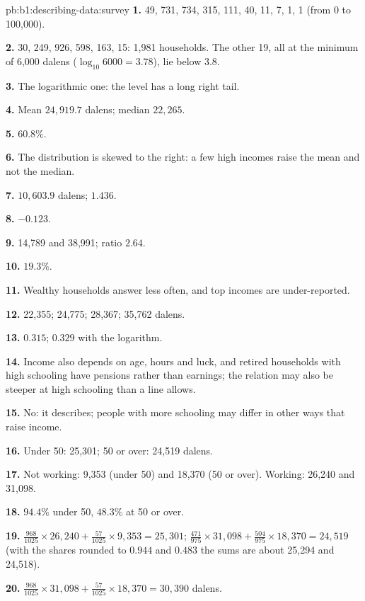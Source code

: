 \begin{solution}{pb:b1:describing-data:survey}
\textbf{1.} 49, 731, 734, 315, 111, 40, 11, 7, 1, 1 (from 0 to 100,000).

\textbf{2.} 30, 249, 926, 598, 163, 15: 1,981 households. The other 19, all at
the minimum of 6,000 dalens ($\log_{10} 6000 = 3.78$), lie below $3.8$.

\textbf{3.} The logarithmic one: the level has a long right tail.

\textbf{4.} Mean $24{,}919.7$ dalens; median $22{,}265$.

\textbf{5.} $60.8\%$.

\textbf{6.} The distribution is skewed to the right: a few high incomes raise
the mean and not the median.

\textbf{7.} $10{,}603.9$ dalens;  $1.436$.

\textbf{8.} $-0.123$.

\textbf{9.} 14,789 and 38,991; ratio $2.64$.

\textbf{10.} $19.3\%$.

\textbf{11.} Wealthy households answer less often, and top incomes are
under-reported.

\textbf{12.} 22,355; 24,775; 28,367; 35,762 dalens.

\textbf{13.} $0.315$; $0.329$ with the logarithm.

\textbf{14.} Income also depends on age, hours and luck, and retired
households with high schooling have pensions rather than earnings; the
relation may also be steeper at high schooling than a line allows.

\textbf{15.} No: it describes; people with more schooling may differ in other
ways that raise income.

\textbf{16.} Under 50: 25,301; 50 or over: 24,519 dalens.

\textbf{17.} Not working: 9,353 (under 50) and 18,370 (50 or over). Working: 26,240
and 31,098.

\textbf{18.} $94.4\%$ under 50, $48.3\%$ at 50 or over.

\textbf{19.} $\tfrac{968}{1025} \times 26{,}240 + \tfrac{57}{1025} \times 9{,}353 = 25{,}301$; $\tfrac{471}{975} \times 31{,}098 + \tfrac{504}{975} \times 18{,}370 = 24{,}519$
(with the shares rounded to $0.944$ and $0.483$ the sums are about 25,294 and 24,518).

\textbf{20.} $\tfrac{968}{1025} \times 31{,}098 + \tfrac{57}{1025} \times 18{,}370 = 30{,}390$ dalens.


\end{solution}
